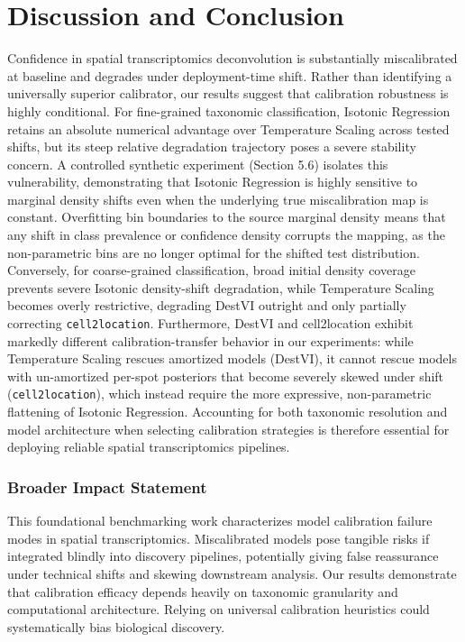 \documentclass{jmlr} %
\begin{document}
\section{Discussion and Conclusion}
\label{sec:conclusion}
Confidence in spatial transcriptomics deconvolution is substantially miscalibrated at baseline and degrades under deployment-time shift. Rather than identifying a universally superior calibrator, our results suggest that calibration robustness is highly conditional. For fine-grained taxonomic classification, Isotonic Regression retains an absolute numerical advantage over Temperature Scaling across tested shifts, but its steep relative degradation trajectory poses a severe stability concern. A controlled synthetic experiment (Section 5.6) isolates this vulnerability, demonstrating that Isotonic Regression is highly sensitive to marginal density shifts even when the underlying true miscalibration map is constant. Overfitting bin boundaries to the source marginal density means that any shift in class prevalence or confidence density corrupts the mapping, as the non-parametric bins are no longer optimal for the shifted test distribution. Conversely, for coarse-grained classification, broad initial density coverage prevents severe Isotonic density-shift degradation, while Temperature Scaling becomes overly restrictive, degrading DestVI outright and only partially correcting \texttt{cell2location}. Furthermore, DestVI and cell2location exhibit markedly different calibration-transfer behavior in our experiments: while Temperature Scaling rescues amortized models (DestVI), it cannot rescue models with un-amortized per-spot posteriors that become severely skewed under shift (\texttt{cell2location}), which instead require the more expressive, non-parametric flattening of Isotonic Regression. Accounting for both taxonomic resolution and model architecture when selecting calibration strategies is therefore essential for deploying reliable spatial transcriptomics pipelines.

\subsubsection*{Broader Impact Statement}
This foundational benchmarking work characterizes model calibration failure modes in spatial transcriptomics. Miscalibrated models pose tangible risks if integrated blindly into discovery pipelines, potentially giving false reassurance under technical shifts and skewing downstream analysis. Our results demonstrate that calibration efficacy depends heavily on taxonomic granularity and computational architecture. Relying on universal calibration heuristics could systematically bias biological discovery.
\end{document}
